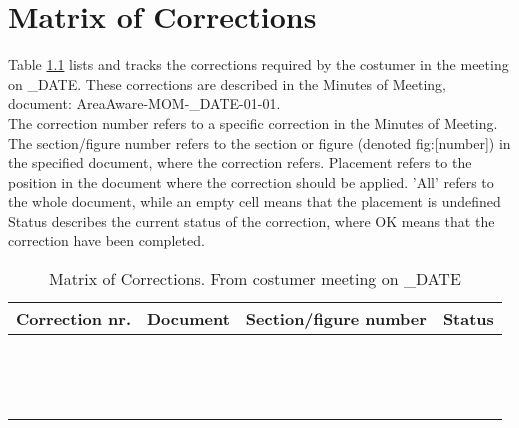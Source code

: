 \chapter{Matrix of Corrections}
\label{chp:matrix}

Table \ref{tb:MoC} lists and tracks the corrections required by the costumer in the meeting on _DATE. These corrections are described in the Minutes of Meeting, document: AreaAware-MOM-_DATE-01-01.\\

The correction number refers to a specific correction in the Minutes of Meeting. 
The section/figure number refers to the section or figure (denoted fig:[number]) in the specified document, where the correction refers. 
Placement refers to the position in the document where the correction should be applied. 'All' refers to the whole document, while an empty cell means that the placement is undefined
Status describes the current status of the correction, where OK means that the correction have been completed.\\

\begin{table}[ht]
\centering
\begin{tabular}{|c|c|>{\centering\arraybackslash}p{3cm}|>{\centering\arraybackslash}p{4cm}|}
\hline \textbf{Correction nr.} & \textbf{Document} & \textbf{Section/figure number} & \textbf{Status} \\ 
\hline  &  &  & \\ 
\hline  &  &  & \\ 
\hline  &  &  & \\ 
\hline  &  &  & \\ 
\hline  &  &  & \\ 
\hline  &  &  & \\ 
\hline  &  &  & \\ 
\hline  &  &  & \\ 
\hline  &  &  & \\ 
\hline  &  &  & \\ 
\hline  &  &  & \\ 
\hline  &  &  & \\ 
\hline  &  &  & \\ 
\hline  &  &  & \\ 
\hline 
\end{tabular}
\caption{Matrix of Corrections. From costumer meeting on _DATE}
\label{tb:MoC} 
\end{table}